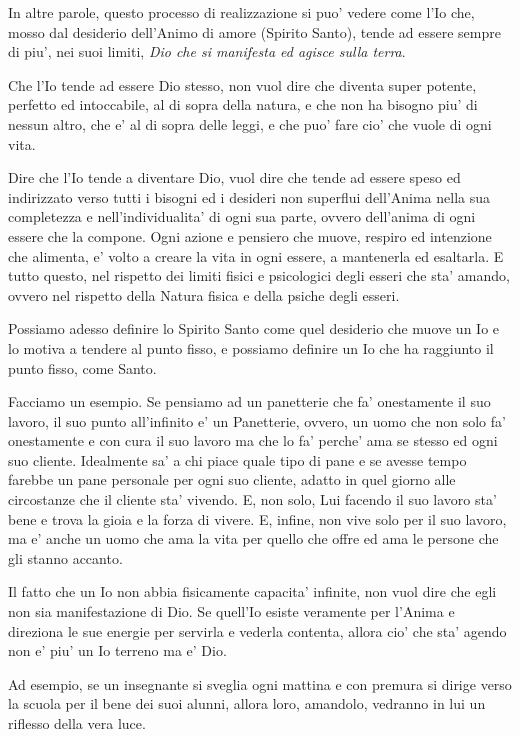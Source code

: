 In altre parole, questo processo di realizzazione si puo' vedere come l'Io che, mosso dal desiderio dell'Animo di amore (Spirito Santo), tende ad essere sempre di piu', nei suoi limiti, \emph{Dio che si manifesta ed agisce sulla terra}.

Che l'Io tende ad essere Dio stesso, non vuol dire che diventa super potente, perfetto ed intoccabile, al di sopra della natura, e che non ha bisogno piu' di nessun altro, che e' al di sopra delle leggi, e che puo' fare cio' che vuole di ogni vita. 

Dire che l'Io tende a diventare Dio, vuol dire che tende ad essere speso ed indirizzato verso tutti i bisogni ed i desideri non superflui dell'Anima nella sua completezza e nell'individualita' di ogni sua parte, ovvero dell'anima di ogni essere che la compone. Ogni azione e pensiero che muove, respiro ed intenzione che alimenta, e' volto a creare la vita in ogni essere, a mantenerla ed esaltarla. E tutto questo, nel rispetto dei limiti fisici e psicologici degli esseri che sta' amando, ovvero nel rispetto della Natura fisica e della psiche degli esseri.

Possiamo adesso definire lo Spirito Santo come quel desiderio che muove un Io e lo motiva a tendere al punto fisso, e possiamo definire un Io che ha raggiunto il punto fisso, come Santo.

Facciamo un esempio. Se pensiamo ad un panetterie che fa' onestamente il suo lavoro, il suo punto all'infinito e' un Panetterie, ovvero, un uomo che non solo fa' onestamente e con cura il suo lavoro ma che lo fa' perche' ama se stesso ed ogni suo cliente. Idealmente sa' a chi piace quale tipo di pane e se avesse tempo farebbe un pane personale per ogni suo cliente, adatto in quel giorno alle circostanze che il cliente sta' vivendo. E, non solo, Lui facendo il suo lavoro sta' bene e trova la gioia e la forza di vivere. E, infine, non vive solo per il suo lavoro, ma e' anche un uomo che ama la vita per quello che offre ed ama le persone che gli stanno accanto.

Il fatto che un Io non abbia fisicamente capacita' infinite, non vuol dire che egli non sia manifestazione di Dio. Se quell'Io esiste veramente per l'Anima e direziona le sue energie per servirla e vederla contenta, allora cio' che sta' agendo non e' piu' un Io terreno ma e' Dio.

Ad esempio, se un insegnante si sveglia ogni mattina e con premura si dirige verso la scuola per il bene dei suoi alunni, allora loro, amandolo, vedranno in lui un riflesso della vera luce.\\

